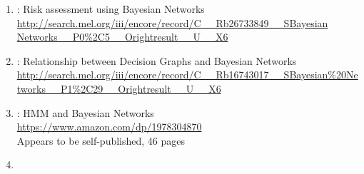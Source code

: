 \begin{enumerate}
  \item {}: Risk assessment using Bayesian Networks
    \\{\scs\url{http://search.mel.org/iii/encore/record/C__Rb26733849__SBayesian Networks__P0%2C5__Orightresult__U__X6}}

  \item {}: Relationship between Decision Graphs and Bayesian Networks
    \\{\scs\url{http://search.mel.org/iii/encore/record/C__Rb16743017__SBayesian%20Networks__P1%2C29__Orightresult__U__X6}}

  \item {}: HMM and Bayesian Networks
     \\\url{https://www.amazon.com/dp/1978304870}
     \\Appears to be self-published, 46 pages

  \item {}
\end{enumerate}


